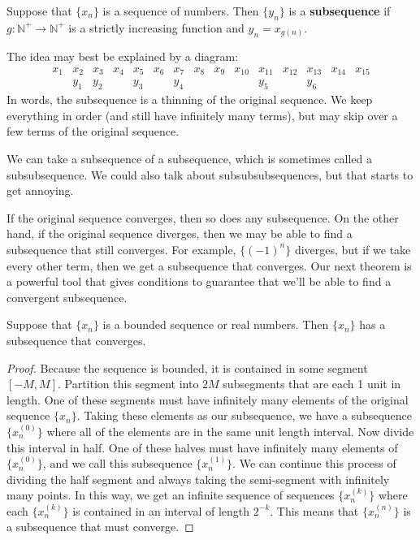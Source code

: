 %
{Suppose that $\{x_n\}$ is a sequence of numbers.  Then $\{y_n\}$ is a \textbf{subsequence} if $g:\mathbb{N}^+\to\mathbb{N}^+$ is a strictly increasing function and $y_n=x_{g(n)}$.}

The idea may best be explained by a diagram:
\[
\begin{array}{ccccccccccccccc}
 x_1 & x_2 & x_3 & x_4 & x_5 & x_6 & x_7 & x_8 & x_9 & x_{10} & x_{11} & x_{12} & x_{13} & x_{14} & x_{15} \\
 & y_1 & y_2 & & y_3 & & y_4 & & & & y_5 & & y_6 & &
\end{array}
\]
In words, the subsequence is a thinning of the original sequence.  We keep everything in order (and still have infinitely many terms), but may skip over a few terms of the original sequence.

We can take a subsequence of a subsequence, which is sometimes called a subsubsequence.  We could also talk about subsubsubsequences, but that starts to get annoying.

If the original sequence converges, then so does any subsequence.  On the other hand, if the original sequence diverges, then we may be able to find a subsequence that still converges.  For example, $\{(-1)^n\}$ diverges, but if we take every other term, then we get a subsequence that converges.  Our next theorem is a powerful tool that gives conditions to guarantee that we'll be able to find a convergent subsequence.

{Suppose that $\{x_n\}$ is a bounded sequence or real numbers.  Then $\{x_n\}$ has a subsequence that converges.}

\begin{proof}
Because the sequence is bounded, it is contained in some segment $[-M,M]$.
Partition this segment into $2M$ subsegments that are each 1 unit in length.  One of these segments must have infinitely many elements of the original sequence $\{x_n\}$.  Taking these elements as our subsequence, we have a subsequence $\{x_n^{(0)}\}$ where all of the elements are in the same unit length interval.  Now divide this interval in half.  One of these halves must have infinitely many elements of $\{x_n^{(0)}\}$, and we call this subsequence $\{x_n^{(1)}\}$.  We can continue this process of dividing the half segment and always taking the semi-segment with infinitely many points.  In this way, we get an infinite sequence of sequences $\{x_n^{(k)}\}$ where each $\{x_n^{(k)}\}$ is contained in an interval of length $2^{-k}$.  This means that $\{x_n^{(n)}\}$ is a subsequence that must converge.
\end{proof}

